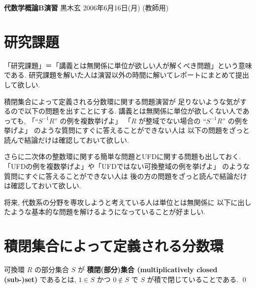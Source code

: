 \documentclass[12pt,twoside]{jarticle}
\newcommand\commentout[1]{#1}
\newcommand\commentout[1]{}
\begin{document}
\noindent
{\Large\bf 代数学概論B演習}
\hfill
{\large 黒木玄}
\qquad
2006年6月16日(月)
\commentout{\quad (教師用)}
\tableofcontents

\section*{研究課題}

「研究課題」＝「講義とは無関係に単位が欲しい人が解くべき問題」という意味
である. 研究課題を解いた人は演習以外の時間に解いてレポートにまとめて提出
して欲しい.

積閉集合によって定義される分数環に関する問題演習が
足りないような気がするので以下の問題を出すことにする.
講義とは無関係に単位が欲しくない人であっても, %
「``$S^{-1}R$'' の例を複数挙げよ」
「$R$ が整域でない場合の ``$S^{-1}R$'' の例を挙げよ」
のような質問にすぐに答えることができない人は
以下の問題をざっと読んで結論だけは確認しておいて欲しい.

さらに二次体の整数環に関する簡単な問題とUFDに関する問題も出しておく.
「UFDの例を複数挙げよ」や「UFDではない可換整域の例を挙げよ」
のような質問にすぐに答えることができない人は
後の方の問題をざっと読んで結論だけは確認しておいて欲しい.

将来, 代数系の分野を専攻しようと考えている人は単位とは無関係に
以下に出したような基本的な問題を解けるようになっていることが好ましい.

\section{積閉集合によって定義される分数環}

\begin{definition}[積閉集合]
 可換環 $R$ の部分集合 $S$ が
 {\bf 積閉(部分)集合 (multiplicatively closed (sub-)set)} であるとは, 
 $1\in S$ かつ $0\not\in S$ で $S$ が積で閉じていることである.
 \qed
\end{definition}
\end{document}
